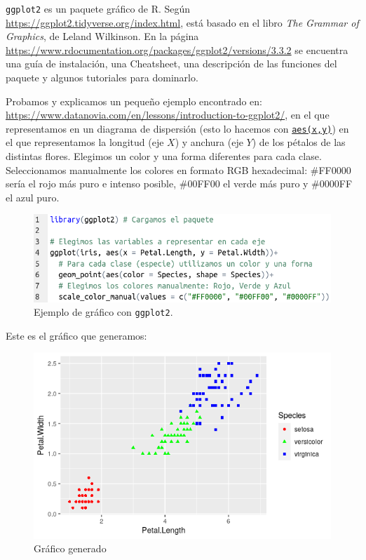 \documentclass[12pt]{article}
\begin{document}
\texttt{ggplot2} es un paquete gráfico de R. Según
\href{https://ggplot2.tidyverse.org/index.html}{https://ggplot2.tidyverse.org/index.html},
está basado en el libro \emph{The Grammar of Graphics}, de Leland
Wilkinson. En la página \\
\href{https://www.rdocumentation.org/packages/ggplot2/versions/3.3.2}{https://www.rdocumentation.org/packages/ggplot2/versions/3.3.2}
se encuentra una guía de instalación, una Cheatsheet, una descripción
de las funciones del paquete y algunos tutoriales para dominarlo.

Probamos y explicamos un pequeño ejemplo encontrado en: \\
\href{https://www.datanovia.com/en/lessons/introduction-to-ggplot2/}{https://www.datanovia.com/en/lessons/introduction-to-ggplot2/},
en el que representamos en un diagrama de dispersión (esto lo hacemos
con
\href{https://www.rdocumentation.org/packages/ggplot2/versions/3.3.2/topics/aes}{\texttt{aes(x,y)}})
en el que representamos la longitud (eje $X$) y anchura (eje $Y$) de
los pétalos de las distintas flores. Elegimos un color y una forma
diferentes para cada clase. Seleccionamos manualmente los colores en
formato RGB hexadecimal: \#FF0000 sería el rojo más puro e intenso
posible, \#00FF00 el verde más puro y \#0000FF el azul puro.

\begin{figure}[H]
  \centering
  \includegraphics[width=120mm]{ggplot2-code}
  \caption{Ejemplo de gráfico con \texttt{ggplot2}.}
\end{figure}

Este es el gráfico que generamos:

\begin{figure}[H]
  \centering
  \includegraphics[width=120mm]{ggplot2-iris}
  \caption{Gráfico generado}
\end{figure}
\end{document}
